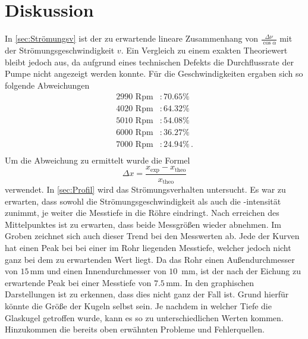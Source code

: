 \section{Diskussion}
\label{sec:Diskussion}

In \autoref{sec:Strömungsv} ist der zu erwartende lineare Zusammenhang von $\frac{\Delta \nu}{\cos \alpha}$ mit der Strömungsgeschwindigkeit $v$. Ein Vergleich zu einem exakten Theoriewert bleibt jedoch aus, 
da aufgrund eines technischen Defekts die Durchflussrate der Pumpe nicht angezeigt werden konnte. Für die Geschwindigkeiten ergaben sich so folgende Abweichungen
\begin{align*}
    2990 \text{ Rpm}&:70.65\%\\
    4020 \text{ Rpm}&:64.32\%\\
    5010 \text{ Rpm}&:54.08\%\\
    6000 \text{ Rpm}&:36.27\%\\
    7000 \text{ Rpm}&:24.94\%\, .\\
\end{align*}
Um die Abweichung zu ermittelt wurde die Formel
\begin{equation*}
    \Delta x=\frac{x_{\text{exp}}-x_{\text{theo}}}{x_{\text{theo}}}
\end{equation*}
verwendet.
In \autoref{sec:Profil} wird das Strömungsverhalten untersucht. Es war zu erwarten, dass sowohl die Strömungsgeschwindigkeit als auch die -intensität zunimmt, je weiter die Messtiefe in die Röhre eindringt.
Nach erreichen des Mittelpunktes ist zu erwarten, dass beide Messgrößen wieder abnehmen. Im Groben zeichnet sich auch dieser Trend bei den Messwerten ab. Jede der Kurven hat einen Peak bei bei einer im Rohr liegenden Messtiefe, welcher jedoch nicht ganz bei dem zu erwartenden Wert liegt.
Da das Rohr einen Außendurchmesser von $15\,$mm und einen Innendurchmesser von $10\,$ mm, ist der nach der Eichung zu erwartende Peak bei einer Messtiefe von $7.5\,$mm.
In den graphischen Darstellungen ist zu erkennen, dass dies nicht ganz der Fall ist. Grund hierfür könnte die Größe der Kugeln selbst sein. Je nachdem in welcher Tiefe die Glaskugel getroffen wurde, kann es so zu unterschiedlichen Werten kommen. 
Hinzukommen die bereits oben erwähnten Probleme und Fehlerquellen.
